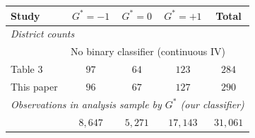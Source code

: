 \begin{tabular}{lcccc}
\toprule
Study & $G^* = -1$ & $G^* = 0$ & $G^* = +1$ & Total \\
\midrule
\multicolumn{5}{l}{\textit{District counts}} \\
\cite{duflo2001schooling}           & \multicolumn{4}{l}{No binary classifier (continuous IV)} \\
\cite{fuzzy2018} Table 3            & $97$  & $64$  & $123$ & $284$ \\
This paper                          & $96$  & $67$  & $127$ & $290$ \\
\midrule
\multicolumn{5}{l}{\textit{Observations in analysis sample by $G^*$ (our classifier)}} \\
                                    & $8{,}647$ & $5{,}271$ & $17{,}143$ & $31{,}061$ \\
\bottomrule
\end{tabular}
